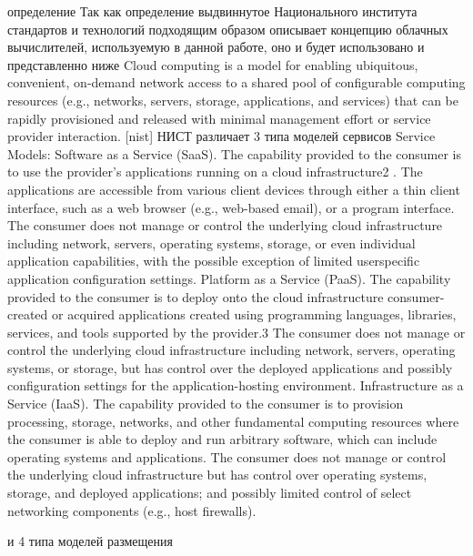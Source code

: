 определение 
Так как определение выдвиннутое Национального института стандартов и технологий подходящим образом описывает концепцию облачных вычислителей, используемую в данной работе, оно и будет использовано и представленно ниже
\fi
Cloud computing is a model for enabling ubiquitous, convenient, on-demand network access to a shared
pool of configurable computing resources (e.g., networks, servers, storage, applications, and services) that
can be rapidly provisioned and released with minimal management effort or service provider interaction. [nist]
НИСТ различает 3 типа моделей сервисов 
\fi
Service Models:
Software as a Service (SaaS). The capability provided to the consumer is to use the provider’s
applications running on a cloud infrastructure2
. The applications are accessible from
various client devices through either a thin client interface, such as a web browser (e.g.,
web-based email), or a program interface. The consumer does not manage or control the
underlying cloud infrastructure including network, servers, operating systems, storage, or
even individual application capabilities, with the possible exception of limited userspecific
application configuration settings.
Platform as a Service (PaaS). The capability provided to the consumer is to deploy onto the cloud
infrastructure consumer-created or acquired applications created using programming languages, libraries, services, and tools supported by the provider.3 The consumer does
not manage or control the underlying cloud infrastructure including network, servers,
operating systems, or storage, but has control over the deployed applications and possibly
configuration settings for the application-hosting environment.
Infrastructure as a Service (IaaS). The capability provided to the consumer is to provision
processing, storage, networks, and other fundamental computing resources where the
consumer is able to deploy and run arbitrary software, which can include operating
systems and applications. The consumer does not manage or control the underlying cloud
infrastructure but has control over operating systems, storage, and deployed applications;
and possibly limited control of select networking components (e.g., host firewalls).

и 4 типа моделей размещения 

